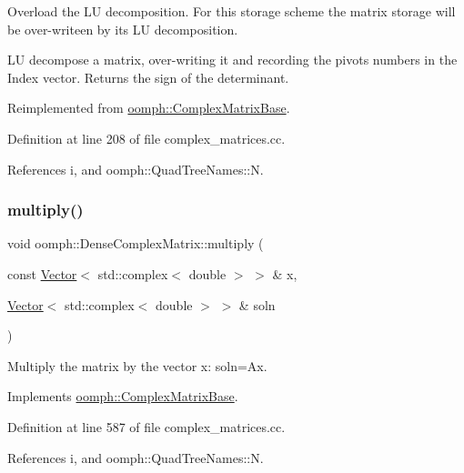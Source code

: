 Overload the LU decomposition. For this storage scheme the matrix storage will be over-\/writeen by its LU decomposition. 

LU decompose a matrix, over-\/writing it and recording the pivots numbers in the Index vector. Returns the sign of the determinant. 

Reimplemented from \hyperlink{classoomph_1_1ComplexMatrixBase_a11e1beeb7767e9bc5e511c17f80f097f}{oomph\+::\+Complex\+Matrix\+Base}.



Definition at line 208 of file complex\+\_\+matrices.\+cc.



References i, and oomph\+::\+Quad\+Tree\+Names\+::N.

\mbox{\label{classoomph_1_1DenseComplexMatrix_afcc47dd450a1ab37d2790b5d0279cadf}} 
\subsubsection{\texorpdfstring{multiply()}{multiply()}\hspace{0.1cm}{\footnotesize\ttfamily [1/2]}}
{\footnotesize\ttfamily void oomph\+::\+Dense\+Complex\+Matrix\+::multiply (\begin{DoxyParamCaption}\item[{const \hyperlink{classoomph_1_1Vector}{Vector}$<$ std\+::complex$<$ double $>$ $>$ \&}]{x,  }\item[{\hyperlink{classoomph_1_1Vector}{Vector}$<$ std\+::complex$<$ double $>$ $>$ \&}]{soln }\end{DoxyParamCaption})\hspace{0.3cm}{\ttfamily [virtual]}}



Multiply the matrix by the vector x\+: soln=Ax. 



Implements \hyperlink{classoomph_1_1ComplexMatrixBase_a730c106643464a29ebf0660a6921ebaa}{oomph\+::\+Complex\+Matrix\+Base}.



Definition at line 587 of file complex\+\_\+matrices.\+cc.



References i, and oomph\+::\+Quad\+Tree\+Names\+::N.



